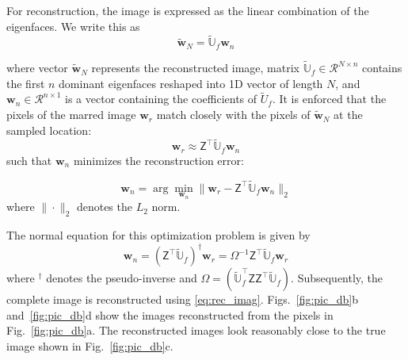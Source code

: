 \documentclass[11pt]{article}
\renewcommand{\vec}[1]{\mathbf{#1}}
\newcommand{\mat}[1]{\mathsf{#1}}
\begin{document}
        For reconstruction, the image is expressed as the linear combination of the eigenfaces.
        We write this as
        \begin{equation}
        \widetilde{\vec{w}}_N = \widetilde{\mathbb{U}}_f\vec{w}_n
        \label{eq:rec_imag}
        \end{equation}

        where vector $\widetilde{\vec{w}}_N$ represents the reconstructed image, matrix $\widetilde{\mathbb{U}}_f\in \mathcal{R}^{N\times n}$ contains the first $n$ dominant eigenfaces reshaped into 1D vector of length $N$, and $\vec{w}_n\in\mathcal{R}^{n\times 1}$ is a vector containing the coefficients of $\widetilde{U}_f$.
        It is enforced that the pixels of the marred image $\vec{w}_r$ match closely with the pixels of $\widetilde{\vec{w}}_N$ at the sampled location:
        \begin{equation}
        {\vec{w}}_r \approx \mat{Z}^{\top}\widetilde{\mathbb{U}}_f\vec{w}_n
        \end{equation}
        such that $\vec{w}_n$ minimizes the  reconstruction error:

        \begin{equation}
           \vec{w}_n = \arg\min_{\vec{w}_n} \| \vec{w}_r - \mat{Z}^{\top}\widetilde{\mathbb{U}}_f\vec{w}_n \|_2
           \label{eq:sampling_optimization}
        \end{equation}
        where $\|\cdot\|_2$ denotes the $L_2$ norm.


        The normal equation for this optimization problem is given by
        \begin{equation}
         {\vec{w}_n} = \left(\mat{Z}^{\top}\widetilde{\mathbb{U}}_f\right)^{\dagger}\vec{w}_r = \Omega^{-1}\mat{Z}^{\top}\widetilde{\mathbb{U}}_f\vec{w}_r
        \label{eq:solution_ak}
        \end{equation}
        where $^{\dagger}$ denotes the pseudo-inverse and $\Omega = \left(\widetilde{\mathbb{U}}_f^{\top}\mat{Z}\mat{Z}^{\top}\widetilde{\mathbb{U}}_f\right)$.
        Subsequently, the complete image is reconstructed using \cref{eq:rec_imag}.
        Figs.~\ref{fig:pic_db}b and~\ref{fig:pic_db}d show the images reconstructed from the pixels in Fig.~\ref{fig:pic_db}a.
        The reconstructed images look reasonably close to the true image shown in Fig.~\ref{fig:pic_db}c.
\end{document}
